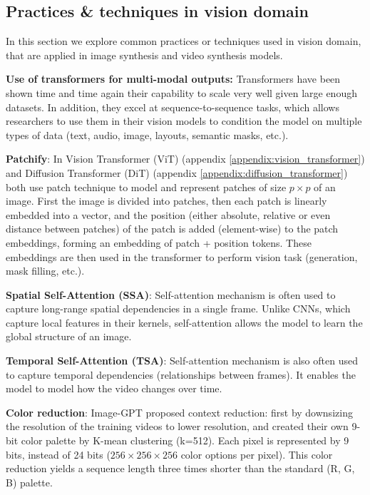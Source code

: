 \subsection{Practices \& techniques in vision domain}

In this section we explore common practices or techniques used in vision domain, that are applied in image synthesis and video synthesis models.

\textbf{Use of transformers for multi-modal outputs:} Transformers have been shown time and time again their capability to scale very well given large enough datasets. In addition, they excel at sequence-to-sequence tasks, which allows researchers to use them in their vision models to condition the model on multiple types of data (text, audio, image, layouts, semantic masks, etc.).

\textbf{Patchify}: In Vision Transformer (ViT) \cite{vision_transformer} (appendix \ref{appendix:vision_transformer}) and Diffusion Transformer (DiT) \cite{diffusion_transformer} (appendix \ref{appendix:diffusion_transformer}) both use patch technique to model and represent patches of size $p \times p$ of an image. First the image is divided into patches, then each patch is linearly embedded into a vector, and the position (either absolute, relative or even distance between patches) of the patch is added (element-wise) to the patch embeddings, forming an embedding of patch + position tokens. These embeddings are then used in the transformer to perform vision task (generation, mask filling, etc.).

\textbf{Spatial Self-Attention (SSA)}: Self-attention mechanism is often used to capture long-range spatial dependencies in a single frame. Unlike CNNs, which capture local features in their kernels, self-attention allows the model to learn the global structure of an image.

\textbf{Temporal Self-Attention (TSA)}: Self-attention mechanism is also often used to capture temporal dependencies (relationships between frames). It enables the model to model how the video changes over time.

\textbf{Color reduction}: Image-GPT \cite{imagegpt} proposed context reduction: first by downsizing the resolution of the training videos to lower resolution, and created their own 9-bit color palette by K-mean clustering (k=512). Each pixel is represented by 9 bits, instead of 24 bits ($256\times 256\times 256$ color options per pixel). This color reduction yields a sequence length three times shorter than the standard (R, G, B) palette.


